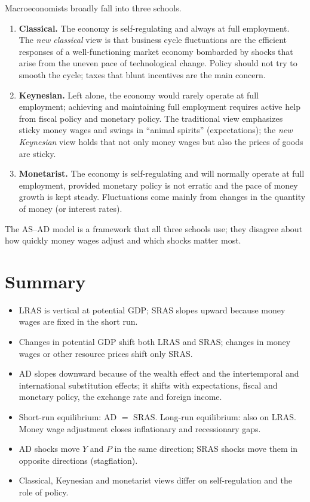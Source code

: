 Macroeconomists broadly fall into three schools.
\begin{enumerate}
  \item \textbf{Classical.} The economy is self-regulating and always at full employment.
        The \emph{new classical} view is that business cycle fluctuations are the efficient
        responses of a well-functioning market economy bombarded by shocks that arise from
        the uneven pace of technological change. Policy should not try to smooth the
        cycle; taxes that blunt incentives are the main concern.
  \item \textbf{Keynesian.} Left alone, the economy would rarely operate at full
        employment; achieving and maintaining full employment requires active help from
        fiscal policy and monetary policy. The traditional view emphasizes sticky money
        wages and swings in ``animal spirits'' (expectations); the \emph{new Keynesian}
        view holds that not only money wages but also the prices of goods are sticky.
  \item \textbf{Monetarist.} The economy is self-regulating and will normally operate at
        full employment, provided monetary policy is not erratic and the pace of money
        growth is kept steady. Fluctuations come mainly from changes in the quantity of
        money (or interest rates).
\end{enumerate}
The AS--AD model is a framework that all three schools use; they disagree about how
quickly money wages adjust and which shocks matter most.

\section{Summary}

\begin{itemize}
  \item LRAS is vertical at potential GDP; SRAS slopes upward because money wages are
        fixed in the short run.
  \item Changes in potential GDP shift both LRAS and SRAS; changes in money wages or
        other resource prices shift only SRAS.
  \item AD slopes downward because of the wealth effect and the intertemporal and
        international substitution effects; it shifts with expectations, fiscal and
        monetary policy, the exchange rate and foreign income.
  \item Short-run equilibrium: AD $=$ SRAS. Long-run equilibrium: also on LRAS. Money wage
        adjustment closes inflationary and recessionary gaps.
  \item AD shocks move $Y$ and $P$ in the same direction; SRAS shocks move them in opposite
        directions (stagflation).
  \item Classical, Keynesian and monetarist views differ on self-regulation and the role
        of policy.
\end{itemize}
